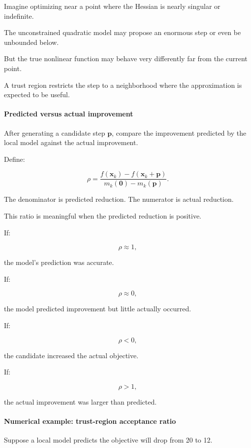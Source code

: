 Imagine optimizing near a point where the Hessian is nearly singular or indefinite.

The unconstrained quadratic model may propose an enormous step or even be unbounded below.

But the true nonlinear function may behave very differently far from the current point.

A trust region restricts the step to a neighborhood where the approximation is expected to be useful.

\paragraph{Predicted versus actual improvement}\label{02-foundations-ii-ch026-predicted-versus-actual-improvement}

After generating a candidate step \(\mathbf p\), compare the improvement predicted by the local model against the actual improvement.

Define:

\[
\boxed{ \rho= \frac{ f(\mathbf x_k)-f(\mathbf x_k+\mathbf p) }{ m_k(\mathbf 0)-m_k(\mathbf p) } }.
\]

The denominator is predicted reduction. The numerator is actual reduction.

This ratio is meaningful when the predicted reduction is positive.

If:

\[
\rho\approx1,
\]

the model's prediction was accurate.

If:

\[
\rho\approx0,
\]

the model predicted improvement but little actually occurred.

If:

\[
\rho<0,
\]

the candidate increased the actual objective.

If:

\[
\rho>1,
\]

the actual improvement was larger than predicted.

\paragraph{Numerical example: trust-region acceptance ratio}\label{02-foundations-ii-ch026-numerical-example-trust-region-acceptance-ratio}

Suppose a local model predicts the objective will drop from 20 to 12.

